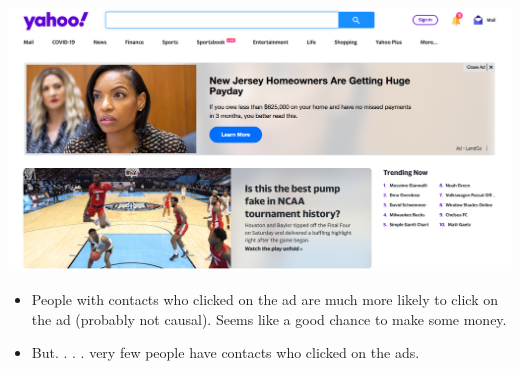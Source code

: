 \documentclass[aspectratio=169]{beamer}
\begin{document}
\begin{frame}

\begin{center}
\includegraphics[width=\textwidth]{figures/yahoo_banner}
\end{center}


\end{frame}
\begin{frame}

\begin{center}
\end{center}
\vfill

\begin{itemize}
\item People with contacts who clicked on the ad are much more likely to click on the ad (probably not causal).  Seems like a good chance to make some money. \pause
\item But. . . . very few people have contacts who clicked on the ads.
\end{itemize}

\end{frame}
\end{document}
